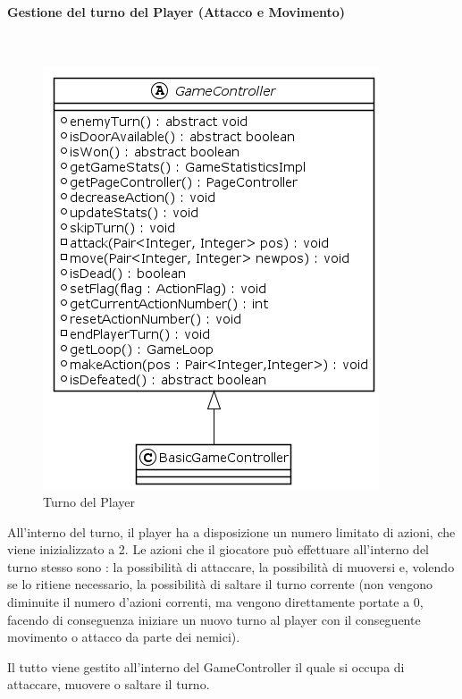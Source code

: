 \documentclass[a4paper,titlepage,12pt]{article}
\begin{document}
\paragraph{Gestione del turno del Player (Attacco e Movimento)}
\par \noindent \\
\begin{figure}[H]
    \centering
    \includegraphics[scale=0.7]{img/uml/GameController.png}
    \caption{Turno del Player}
    \label{fig: Turno del Player}
\end{figure}
\par \noindent All’interno del turno, il player ha a disposizione un numero limitato di azioni, che viene inizializzato a 2. Le azioni che il giocatore può effettuare all’interno del turno stesso sono : la possibilità di attaccare, la possibilità di muoversi e, volendo se lo ritiene necessario, la possibilità di saltare il turno corrente (non vengono diminuite il numero d’azioni correnti, ma vengono direttamente portate a 0, facendo di conseguenza iniziare un nuovo turno al player con il conseguente movimento o attacco da parte dei nemici).
\par \noindent Il tutto viene gestito all’interno del GameController il quale si occupa di attaccare, muovere o saltare il turno.
\newpage
\end{document}
